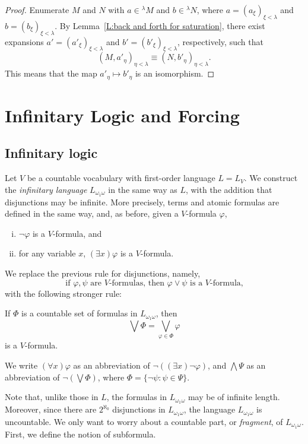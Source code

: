 \documentclass{scrartcl}
\renewcommand{\phi}{\varphi}
\begin{document}
\begin{proof}
Enumerate $M$ and $N$ with $a\in{}^\lambda M$ and $b\in{}^\lambda N$, where
$a=(a_\xi)_{\xi<\lambda}$
and
$b=(b_\xi)_{\xi<\lambda}$. 
By Lemma~\ref{L:back and forth for saturation}, there exist expansions 
$a'=(a'_\xi)_{\xi<\lambda}$
and
$b'=(b'_\xi)_{\xi<\lambda}$, 
respectively, such that
\[
(M,a'_\eta)_{\eta<\lambda} \equiv (N,b'_\eta)_{\eta<\lambda}.
\]
This means that the map $a'_\eta\mapsto b'_\eta$ is an isomorphism.
\end{proof}






\section{Infinitary Logic and Forcing}

\subsection{Infinitary logic}


Let $V$ be a countable vocabulary with first-order language $L=L_V$. We construct the \emph{infinitary language} $L_{\omega_1\omega}$ in the same way as $L$, with the addition that disjunctions may be infinite. More precisely, terms and atomic formulas are defined in the same way, and, as before, given a $V$-formula $\phi$,
\begin{enumerate}[i)]
\item $\neg\varphi$ is a $V$-formula, and

\item for any variable $x$, $(\exists x)\varphi$ is a $V$-formula.
\end{enumerate}
We replace the previous rule for disjunctions, namely,
\[
\text{if } \phi,\psi \text{ are }V\text{-formulas, then }\phi\vee\psi\text{ is a }V\text{-formula,}
\]
with the following stronger rule:

If $\Phi$ is a countable set of formulas in $L_{\omega_1\omega}$, then
\[
\bigvee \Phi = \bigvee_{\phi\in \Phi}\phi
\]
is a $V$-formula.

We write $(\forall x)\phi$ as an abbreviation of $\neg( (\exists x) \neg \phi )$, and $\bigwedge  \Psi$ as an abbreviation of $\neg ( \bigvee \Phi ) $, where $\Phi = \{ \neg\psi \colon \psi\in \Psi \} $.



Note that, unlike those in $L$, the formulas in $L_{\omega_1\omega}$ may be of infinite length. Moreover, since there are $2^{\aleph_{0}}$ disjunctions in $L_{\omega_1\omega}$, the language $L_{\omega_1\omega}$ is uncountable. We only want to worry about a countable part, or \emph{fragment}, of $L_{\omega_1\omega}$. First, we define the notion of subformula.
\end{document}
